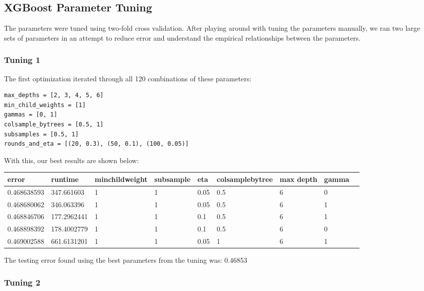 \documentclass[twoside,11pt]{article}
\theoremstyle{definition}
\begin{document}
  \subsection{XGBoost Parameter Tuning}
    The parameters were tuned using two-fold cross validation. After playing around with tuning the parameters manually, we ran two large sets of parameters in an attempt to reduce error and understand the empirical relationships between the parameters.

    \subsubsection{Tuning 1}
      The first optimization iterated through all 120 combinations of these parameters:

      \begin{lstlisting}
max_depths = [2, 3, 4, 5, 6]
min_child_weights = [1]
gammas = [0, 1]
colsample_bytrees = [0.5, 1]
subsamples = [0.5, 1]
rounds_and_eta = [(20, 0.3), (50, 0.1), (100, 0.05)]
      \end{lstlisting}

      With this, our best results are shown below:

      \begin{center}
          \begin{tabular}{ | l | l | l | l | l | l | l | l | p{5cm} |}
          \hline
          error & runtime & minchildweight & subsample & eta & colsamplebytree & max depth & gamma \\ \hline
          0.468638593 & 347.661603 & 1 & 1 & 0.05 & 0.5 & 6 & 0 \\ \hline
          0.468680062 & 346.063396 & 1 & 1 & 0.05 & 0.5 & 6 & 1 \\ \hline
          0.468846706 & 177.2962441 & 1 & 1 & 0.1 & 0.5 & 6 & 1 \\ \hline
          0.468898392 & 178.4002779 & 1 & 1 & 0.1 & 0.5 & 6 & 0 \\ \hline
          0.469002588 & 661.6131201 & 1 & 1 & 0.05 & 1 & 6 & 1 \\ \hline
          \end{tabular}
      \end{center}

      The testing error found using the best parameters from the tuning was: 0.46853

    \subsubsection{Tuning 2}
\end{document}
